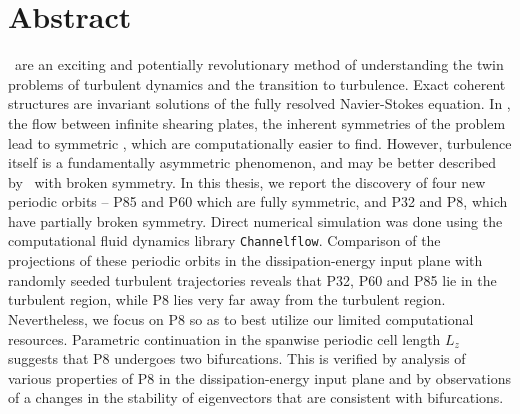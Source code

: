     \chapter*{Abstract}
	\Ecs\ are an exciting and potentially revolutionary method of understanding the twin problems of turbulent dynamics and the transition to turbulence. Exact coherent structures are invariant solutions of the fully resolved Navier-Stokes equation.  In \pCf, the flow between infinite shearing plates, the inherent symmetries of the problem lead to symmetric \ecs, which are computationally easier to find. However, turbulence itself is a fundamentally asymmetric phenomenon, and may be better described by \ecs\ with broken symmetry. In this thesis, we report the discovery of four new periodic orbits -- P85 and P60 which are fully symmetric, and P32 and P8, which have partially broken symmetry. Direct numerical simulation was done using the computational fluid dynamics library {\tt Channelflow}. Comparison of the projections of these periodic orbits in the dissipation-energy input plane with randomly seeded turbulent trajectories reveals that P32, P60 and P85 lie in the turbulent region, while P8 lies very far away from the turbulent region. Nevertheless, we focus on P8 so as to best utilize our limited computational resources. Parametric continuation in the spanwise periodic cell length $L_z$ suggests that P8 undergoes two bifurcations. This is verified by analysis of various properties of P8 in the dissipation-energy input plane and by observations of a changes in the stability of eigenvectors that are consistent with bifurcations.   